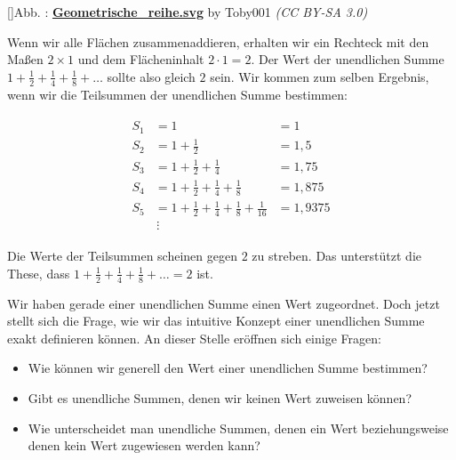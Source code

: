 \documentclass[fontsize=9pt,
               parskip=half-,
               DIV=14,
               listof=chapterentry,
               tocflat]{scrbook}
\newcounter{imagelabel}
\begin{document}
[]{Abb. : \protect\href{https://commons.wikimedia.org/wiki/File:Geometrische_reihe.svg}{\textbf{Geometrische\allowbreak\_reihe.svg}} by Toby001 \textit{(CC BY-SA 3.0)}}\begin{center}
\end{center}

Wenn wir alle Flächen zusammenaddieren, erhalten wir ein Rechteck mit den Maßen $2\times 1$ und dem Flächeninhalt $2\cdot 1=2$. Der Wert der unendlichen Summe $1+{\tfrac {1}{2}}+{\tfrac {1}{4}}+{\tfrac {1}{8}}+\ldots $ sollte also gleich $2$ sein. Wir kommen zum selben Ergebnis, wenn wir die Teilsummen der unendlichen Summe bestimmen:

\begin{align*}
{\begin{array}{rll}S_{1}&=1&=1\\[0.5em]S_{2}&=1+{\tfrac {1}{2}}&=1{,}5\\[0.5em]S_{3}&=1+{\tfrac {1}{2}}+{\tfrac {1}{4}}&=1{,}75\\[0.5em]S_{4}&=1+{\tfrac {1}{2}}+{\tfrac {1}{4}}+{\tfrac {1}{8}}&=1{,}875\\[0.5em]S_{5}&=1+{\tfrac {1}{2}}+{\tfrac {1}{4}}+{\tfrac {1}{8}}+{\tfrac {1}{16}}&=1{,}9375\\[0.5em]&\,\vdots \end{array}}
\end{align*}

Die Werte der Teilsummen scheinen gegen $2$ zu streben. Das unterstützt die These, dass $1+{\tfrac {1}{2}}+{\tfrac {1}{4}}+{\tfrac {1}{8}}+\ldots =2$ ist.

Wir haben gerade einer unendlichen Summe einen Wert zugeordnet. Doch jetzt stellt sich die Frage, wie wir das intuitive Konzept einer unendlichen Summe exakt definieren können. An dieser Stelle eröffnen sich einige Fragen:

\begin{itemize}
\item Wie können wir generell den Wert einer unendlichen Summe bestimmen?
\item Gibt es unendliche Summen, denen wir keinen Wert zuweisen können?
\item Wie unterscheidet man unendliche Summen, denen ein Wert beziehungsweise denen kein Wert zugewiesen werden kann?
\end{itemize}
\end{document}
